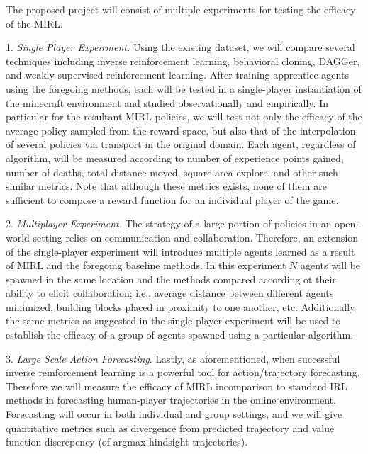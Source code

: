 \documentclass[11pt]{article}
\begin{document}
The proposed project will consist of multiple experiments for testing the efficacy of the MIRL. 

1. \emph{Single Player Expeirment.} Using the existing dataset, we will compare several techniques including inverse reinforcement learning, behavioral cloning, DAGGer, and weakly supervised reinforcement learning. After training apprentice agents using the foregoing methods, each will be tested in a single-player instantiation of the minecraft environment and studied observationally and empirically. In particular for the resultant MIRL policies, we will test not only the efficacy of the average policy sampled from the reward space, but also that of the interpolation of several policies via transport in the original domain. Each agent, regardless of algorithm, will be measured according to number of experience points gained, number of deaths, total distance moved, square area explore, and other such similar metrics. Note that although these metrics exists, none of them are sufficient to compose a reward function for an individual player of the game.

2.\emph{ Multiplayer Experiment.} The strategy of a large portion of policies in an open-world setting relies on communication and collaboration. Therefore, an extension of the single-player experiment will introduce multiple agents learned as a result of MIRL and the foregoing baseline methods. In this experiment $N$ agents will be spawned in the same location and the methods compared according ot their ability to elicit collaboration; i.e., average distance between different agents minimized, building blocks placed in proximity to one another, etc. Additionally the same metrics as suggested in the single player experiment will be used to establish the efficacy of a group of agents spawned using a particular algorithm.

3. \emph{Large Scale Action Forecasting}. Lastly, as aforementioned, when successful inverse reinforcement learning is a powerful tool for action/trajectory forecasting. Therefore we will measure the efficacy of MIRL incomparison to standard IRL methods in forecasting human-player trajectories in the online environment. Forecasting will occur in both individual and group settings, and we will give quantitative metrics such as divergence from predicted trajectory and value function discrepency (of argmax hindsight trajectories).







\end{document}
